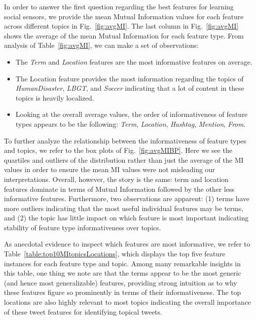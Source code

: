 In order to answer the first question regarding the best features
for learning social sensors, we provide the mean Mutual Information
values for each feature across different topics in Fig.~\ref{fig:avgMI}.
The last column in Fig.~\ref{fig:avgMI} shows the
average of the mean Mutual Information for each feature type. From analysis of
Table~\ref{fig:avgMI}, we can make a set of observations:
\begin{itemize}
\item The \textit{Term} and \textit{Location} features are the most informative features on average.%
\item The Location feature provides the most information regarding the topics of \textit{HumanDisaster}, \textit{LBGT}, and \textit{Soccer} indicating that a lot of content in these topics is heavily localized.
\item Looking at the overall average values, the order of informativeness of feature types appears to be the following: \textit{Term}, \textit{Location}, \textit{Hashtag}, \textit{Mention}, \textit{From}.
\end{itemize}
To further analyze the relationship between the informativeness of feature types and topics,
we refer to the box plots of Fig.~\ref{fig:avgMIBP}.  Here we see the quartiles and outliers of
the distribution rather than just the average of the MI values in order to ensure the mean MI
values were not misleading our interpretations.  Overall, however, the story is the same: term
and location features dominate in terms of Mutual Information followed by the other less informative
features.  Furthermore, two observations are apparent: (1) terms have more outliers indicating that
the most useful individual features may be terms, and (2) the topic has little impact on which feature
is most important indicating stability of feature type informativeness over topics.

As anecdotal evidence to inspect which features are most informative, we refer to
Table~\ref{table:top10MItopicsLocations}, which displays the top five feature instances
for each feature type and topic.  Among many remarkable insights in this table, one thing
we note are that the terms appear to be the most generic (and hence most generalizable) features,
providing strong intuition as to why these features figure so prominently in terms of
their informativeness.  The top locations are also highly relevant to most topics indicating
the overall importance of these tweet features for identifying topical tweets.


